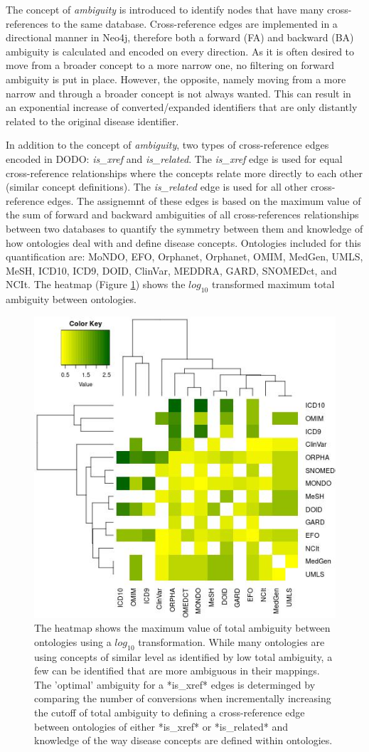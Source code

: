 \documentclass[9pt,a4paper,]{extarticle}
\begin{document}
The concept of \emph{ambiguity} is introduced to identify nodes that have many cross-references to the same database. Cross-reference edges are implemented in a directional manner in Neo4j, therefore both a forward (FA) and backward (BA) ambiguity is calculated and encoded on every direction. As it is often desired to move from a broader concept to a more narrow one, no filtering on forward ambiguity is put in place. However, the opposite, namely moving from a more narrow and through a broader concept is not always wanted. This can result in an exponential increase of converted/expanded identifiers that are only distantly related to the original disease identifier.

In addition to the concept of \emph{ambiguity}, two types of cross-reference edges encoded in DODO: \emph{is\_xref} and \emph{is\_related}. The \emph{is\_xref} edge is used for equal cross-reference relationships where the concepts relate more directly to each other (similar concept definitions). The \emph{is\_related} edge is used for all other cross-reference edges. The assignemnt of these edges is based on the maximum value of the sum of forward and backward ambiguities of all cross-references relationships between two databases to quantify the symmetry between them and knowledge of how ontologies deal with and define disease concepts. Ontologies included for this quantification are: MoNDO, EFO, Orphanet, Orphanet, OMIM, MedGen, UMLS, MeSH, ICD10, ICD9, DOID, ClinVar, MEDDRA, GARD, SNOMEDct, and NCIt. The heatmap (Figure \ref{fig:heatmapAmbiguity}) shows the \(log_{10}\) transformed maximum total ambiguity between ontologies.

\begin{figure}

{\centering \includegraphics[width=0.5\linewidth]{fig/heatmap_ambiguity} 

}

\caption{The heatmap shows the maximum value of total ambiguity between ontologies using a $log_{10}$ transformation. While many ontologies are using concepts of similar level as identified by low total ambiguity, a few can be identified that are more ambiguous in their mappings. The 'optimal' ambiguity for a *is\_xref* edges is determinged by comparing the number of conversions when incrementally increasing the cutoff of total ambiguity to defining a cross-reference edge between ontologies of either *is\_xref* or *is\_related* and knowledge of the way disease concepts are defined within ontologies.}\label{fig:heatmapAmbiguity}
\end{figure}
\end{document}
